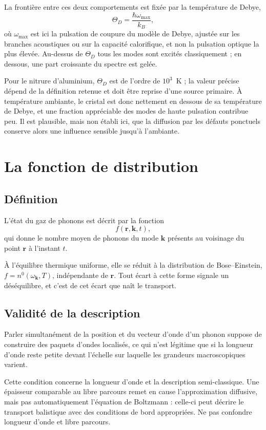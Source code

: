 \documentclass[11pt,a4paper]{article}
\begin{document}
La frontière entre ces deux comportements est fixée par la température de Debye,
\[ \Theta_D = \frac{\hbar\omega_{\max}}{k_B} , \]
où $\omega_{\max}$ est ici la pulsation de coupure du modèle de Debye, ajustée sur les branches
acoustiques ou sur la capacité calorifique, et non la pulsation optique la plus élevée. Au-dessus de
$\Theta_D$ tous les modes sont excités classiquement ; en dessous, une part croissante du spectre
est gelée.

Pour le nitrure d'aluminium, $\Theta_D$ est de l'ordre de $10^3$~K ; la valeur précise dépend de
la définition retenue et doit être reprise d'une source primaire. À température ambiante, le cristal
est donc nettement en dessous de sa température de Debye, et une fraction appréciable des modes de
haute pulsation contribue peu. Il est plausible, mais non établi ici, que la diffusion par les
défauts ponctuels conserve alors une influence sensible jusqu'à l'ambiante.

\section{La fonction de distribution}

\subsection{Définition}

L'état du gaz de phonons est décrit par la fonction
\[ f(\mathbf{r}, \mathbf{k}, t) , \]
qui donne le nombre moyen de phonons du mode $\mathbf{k}$ présents au voisinage du point
$\mathbf{r}$ à l'instant $t$.

À l'équilibre thermique uniforme, elle se réduit à la distribution de Bose--Einstein,
$f = n^0(\omega_\mathbf{k}, T)$, indépendante de $\mathbf{r}$. Tout écart à cette forme signale un
déséquilibre, et c'est de cet écart que naît le transport.

\subsection{Validité de la description}

Parler simultanément de la position et du vecteur d'onde d'un phonon suppose de construire des
paquets d'ondes localisés, ce qui n'est légitime que si la longueur d'onde reste petite devant
l'échelle sur laquelle les grandeurs macroscopiques varient.

Cette condition concerne la longueur d'onde et la description semi-classique.
Une épaisseur comparable au libre parcours remet en cause l'approximation diffusive,
mais pas automatiquement l'équation de Boltzmann : celle-ci peut décrire le transport
balistique avec des conditions de bord appropriées. Ne pas confondre longueur d'onde
et libre parcours.
\end{document}
